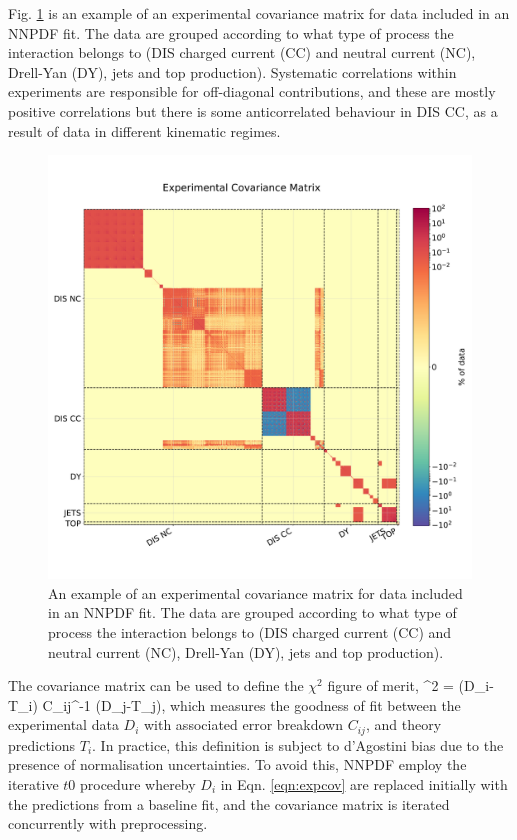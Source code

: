 Fig. \ref{fig:expcovmat} is an example of an experimental covariance matrix for data included in an NNPDF fit. The data are grouped according to what type of process the interaction belongs to (DIS charged current (CC) and neutral current (NC), Drell-Yan (DY), jets and top production). Systematic correlations within experiments are responsible for off-diagonal contributions, and these are mostly positive correlations but there is some anticorrelated behaviour in DIS CC, as a result of data in different kinematic regimes. 

\begin{figure}
\centering
\includegraphics[width=15cm]{background/exp_covmat.pdf}
\caption{An example of an experimental covariance matrix for data included in an NNPDF fit. The data are grouped according to what type of process the interaction belongs to (DIS charged current (CC) and neutral current (NC), Drell-Yan (DY), jets and top production).}
\label{fig:expcovmat}
\end{figure}

The covariance matrix can be used to define the $\chi^2$ figure of merit, 
\be
\label{eqn:chi2}
\chi^2 =  (D_i-T_i) C_{ij}^{-1} (D_j-T_j),
\ee
which measures the goodness of fit between the experimental data $D_i$ with associated error breakdown $C_{ij}$, and theory predictions $T_i$. In practice, this definition is subject to d'Agostini bias \cite{DAgostini:1993arp} due to the presence of normalisation uncertainties. To avoid this, NNPDF employ the iterative $t0$ procedure \cite{Ball:2009qv} whereby $D_i$ in Eqn. \ref{eqn:expcov} are replaced initially with the predictions from a baseline fit, and the covariance matrix is iterated concurrently with preprocessing. 


